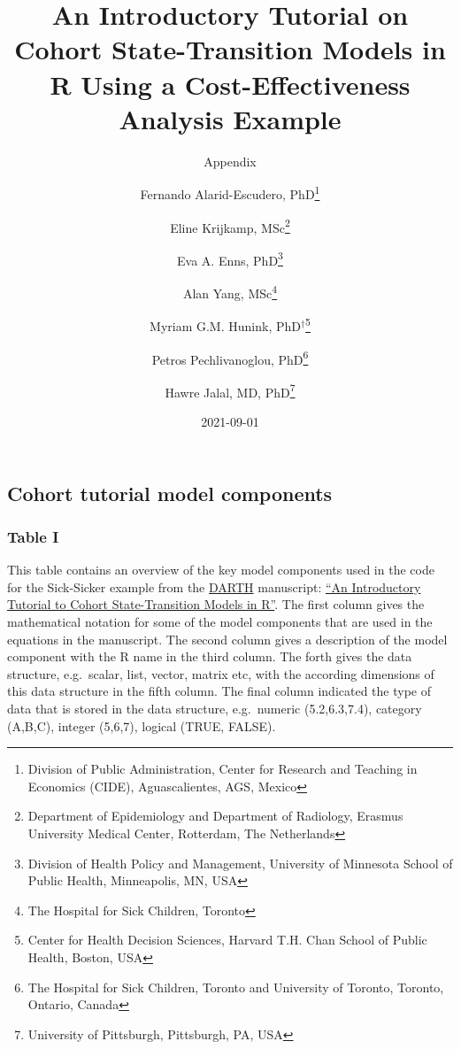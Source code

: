 \documentclass[
  landscape]{article}
\title{An Introductory Tutorial on Cohort State-Transition Models in R
Using a Cost-Effectiveness Analysis Example}
\subtitle{Appendix}
\author{Fernando Alarid-Escudero, PhD\footnote{Division of Public
  Administration, Center for Research and Teaching in Economics (CIDE),
  Aguascalientes, AGS, Mexico} \and Eline Krijkamp,
MSc\footnote{Department of Epidemiology and Department of Radiology,
  Erasmus University Medical Center, Rotterdam, The Netherlands} \and Eva
A. Enns, PhD\footnote{Division of Health Policy and Management,
  University of Minnesota School of Public Health, Minneapolis, MN, USA} \and Alan
Yang, MSc\footnote{The Hospital for Sick Children, Toronto} \and Myriam
G.M. Hunink, PhD\(^\dagger\)\footnote{Center for Health Decision
  Sciences, Harvard T.H. Chan School of Public Health, Boston, USA} \and Petros
Pechlivanoglou, PhD\footnote{The Hospital for Sick Children, Toronto and
  University of Toronto, Toronto, Ontario, Canada} \and Hawre Jalal, MD,
PhD\footnote{University of Pittsburgh, Pittsburgh, PA, USA}}
\date{2021-09-01}
\begin{document}
\maketitle

\hypertarget{cohort-tutorial-model-components}{%
\subsection{Cohort tutorial model
components}\label{cohort-tutorial-model-components}}

\hypertarget{table-i}{%
\subsubsection{Table I}\label{table-i}}

This table contains an overview of the key model components used in the
code for the Sick-Sicker example from the
\href{http://darthworkgroup.com/}{DARTH} manuscript:
\href{https://arxiv.org/abs/2001.07824}{``An Introductory Tutorial to
Cohort State-Transition Models in R''}. The first column gives the
mathematical notation for some of the model components that are used in
the equations in the manuscript. The second column gives a description
of the model component with the R name in the third column. The forth
gives the data structure, e.g.~scalar, list, vector, matrix etc, with
the according dimensions of this data structure in the fifth column. The
final column indicated the type of data that is stored in the data
structure, e.g.~numeric (5.2,6.3,7.4), category (A,B,C), integer
(5,6,7), logical (TRUE, FALSE).
\end{document}
